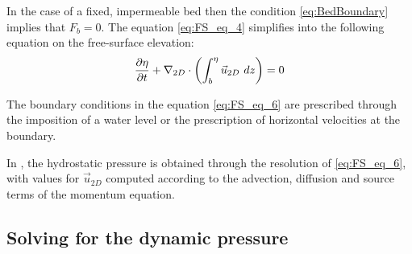 In the case of a fixed, impermeable bed then the condition \eqref{eq:BedBoundary}
implies that $F_b=0$. The equation \eqref{eq:FS_eq_4} simplifies
into the following equation on the free-surface elevation:
\begin{align}
  \dfrac{\partial\eta}{\partial t}
  + \nabla_{2D} \cdot\left(\int_b^\eta\vec{u}_{2D}~dz\right)
  = 0
  \label{eq:FS_eq_6}
\end{align}

The boundary conditions in the equation \eqref{eq:FS_eq_6} are prescribed through the imposition of a water level or the prescription of horizontal velocities at the boundary.

In , the hydrostatic pressure is obtained through the resolution of \eqref{eq:FS_eq_6}, with values for $\vec{u}_{2D}$
computed according to the advection, diffusion and source terms of the momentum equation.

\subsection{Solving for the dynamic pressure}\label{sec:Chorin}

